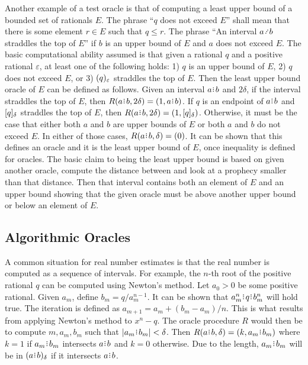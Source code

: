 \documentclass[12pt]{article}
\begin{document}
Another example of a test oracle is that of computing a least upper bound of a bounded set of rationals $E$. The phrase ``$q$ does not exceed $E$'' shall mean that there is some element $r \in E$ such that $q \leq r$. The phrase ``An interval $a \lte b$ straddles the top of $E$'' if $b$ is an upper bound of $E$ and $a$ does not exceed $E$. The basic computational ability assumed is that given a rational $q$ and a positive rational $\varepsilon$, at least one of the following holds: 1) $q$ is an upper bound of $E$, 2) $q$ does not exceed $E$, or 3)  $\halo[\varepsilon]{q}$ straddles the top of $E$. Then the least upper bound oracle of $E$ can be defined as follows. Given an interval $a \rint  b$ and $2 \delta$, if the interval straddles the top of $E$, then $R(a \rint  b, 2\delta) = (1, a\rint b)$. If $q$ is an endpoint of $a\rint b$ and  $\clhalo{q}$ straddles the top of $E$, then $R(a\rint b, 2\delta)= (1, \clhalo{q})$. Otherwise, it must be the case that either both $a$ and $b$ are upper bounds of $E$ or both $a$ and $b$ do not exceed $E$. In either of those cases, $R(a \rint b, \delta) = (0)$. It can be shown that this defines an oracle and it is the least upper bound of $E$, once inequality is defined for oracles. The basic claim to being the least upper bound is based on given another oracle, compute the distance between and look at a prophecy smaller than that distance. Then that interval contains both an element of $E$ and an upper bound showing that the given oracle must be above another upper bound or below an element of $E$.




\subsection{Algorithmic Oracles}\label{os-sect-algo}


A common situation for real number estimates is that the real number is computed as a sequence of intervals. For example, the $n$-th root of the positive rational $q$ can be computed using Newton's method. Let $a_0 >0$ be some positive rational. Given $a_m$, define $b_m = q/a_m^{n-1}$. It can be shown that $a_m^n \rint  q \rint  b_m^n$ will hold true. The iteration is defined as $a_{m+1} = a_m + (b_m - a_m)/n$. This is what results from applying Newton's method to $x^n - q$. The oracle procedure $R$ would then be to compute $m, a_m, b_m$ such that $|a_m \rint  b_m| < \delta$.  Then $R(a\rint b, \delta) = (k, a_m\rint b_m)$ where $k=1$ if $a_m\rint b_m$ intersects $a\rint b$ and $k =0$ otherwise. Due to the length, $a_m\rint b_m$ will be in $\halo{a\rint b}$ if it intersects $a\rint b$. 
\end{document}
